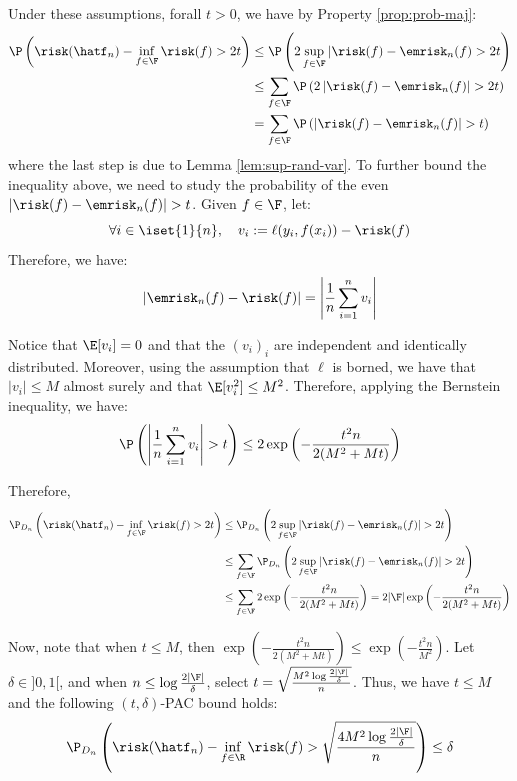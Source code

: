 \documentclass[toc, titlepaged]{../cs-classes/cs-classes}
\begin{document}
Under these assumptions, forall $t>0$, we have by Property \ref{prop:prob-maj}:
\begin{equation*}
    \begin{aligned}
        \P\left(\risk(\hatf_n)-\inf_{f\in\F}\risk(f)>2t\right) &\leq \P\left(2\sup_{f\in\F}|\risk(f)-\emrisk_n(f)>2t\right) \\
        &\leq \sum_{f\in\F}\P\left(2\left|\risk(f)-\emrisk_n(f)\right|>2t\right) \\
        &= \sum_{f\in\F}\P\left(\left|\risk(f)-\emrisk_n(f)\right|>t\right)
    \end{aligned}
\end{equation*}
where the last step is due to Lemma \ref{lem:sup-rand-var}. To further bound the inequality above, we need to study the probability of the even $\left|\risk(f)-\emrisk_n(f)\right|>t$. Given $f\in\F$, let:
\begin{equation*}
    \forall i\in\iset{1}{n}, \quad v_i := \ell(y_i, f(x_i)) - \risk(f)
\end{equation*}
Therefore, we have:
\begin{equation*}
    \left|\emrisk_n(f)-\risk(f)\right| = \left|\frac{1}{n}\sum_{i=1}^nv_i\right|
\end{equation*}

Notice that $\E[v_i]=0$ and that the $(v_i)_i$ are independent and identically distributed. Moreover, using the assumption that $\ell$ is borned, we have that $|v_i|\leq M$ almost surely and that $\E[v_i^2]\leq M^2$. Therefore, applying the Bernstein inequality, we have:
\begin{equation*}
    \P\left(\left|\frac{1}{n}\sum_{i=1}^n v_i\right|>t\right) \leq 2\exp\left(-\frac{t^2n}{2(M^2+Mt)}\right)
\end{equation*}

Therefore, 
\begin{equation*}
    \begin{aligned}
        \P_{D_n}\left(\risk(\hatf_n)-\inf_{f\in\F}\risk(f)>2t\right) &\leq \P_{D_n}\left(2\sup_{f\in\F}\left|\risk(f)-\emrisk_n(f)\right|>2t\right) \\
        &\leq \sum_{f\in\F}\P_{D_n}\left(2\sup_{f\in\F}\left|\risk(f)-\emrisk_n(f)\right|>2t\right) \\
        &\leq \sum_{f\in\F}2\exp\left(-\frac{t^2n}{2(M^2+Mt)}\right) = 2|\F|\exp\left(-\frac{t^2n}{2(M^2+Mt)}\right)
    \end{aligned}
\end{equation*}

Now, note that when $t\leq M$, then $\exp\left(-\frac{t^2n}{2(M^2+Mt)}\right) \leq \exp\left(-\frac{t^2n}{M^2}\right)$. Let $\delta\in]0, 1[$, and when $n\leq \log \frac{2|\F|}{\delta}$, select $t=\sqrt{\frac{M^2\log \frac{2|\F|}{\delta}}{n}}$. Thus, we have $t\leq M$ and the following $(t, \delta)$-PAC bound holds:
\begin{equation*}
    \P_{D_n}\left(\risk(\hatf_n)-\inf_{f\in\R}\risk(f) > \sqrt{\frac{4M^2\log \frac{2|\F|}{\delta}}{n}}\right) \leq \delta
\end{equation*}
\end{document}
